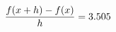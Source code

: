 \documentclass[preview]{standalone}
\begin{document}
\begin{align*}
\special{dvisvgm:raw <g id='unique000'>}\frac{f(x+h)-f(x)}{h} = 3.505\special{dvisvgm:raw </g>}
\end{align*}
\end{document}
